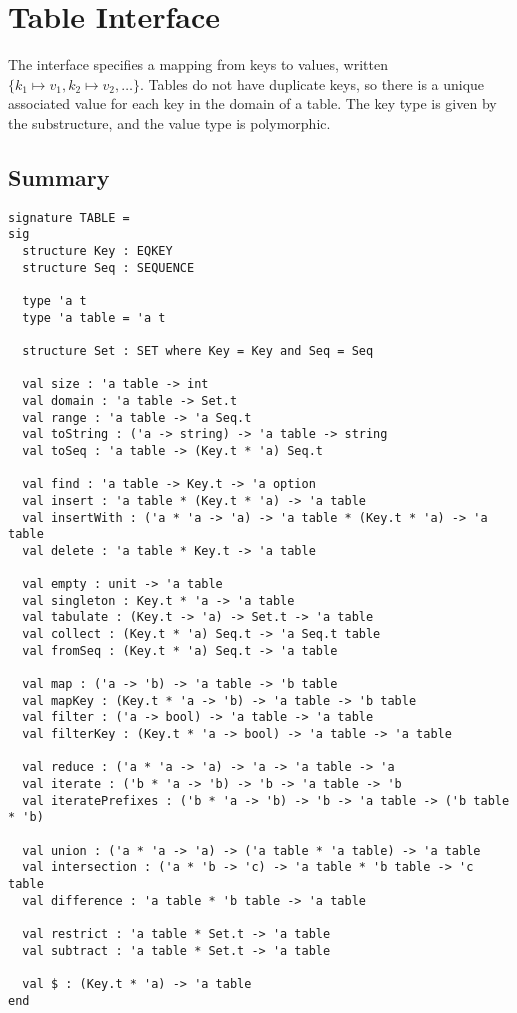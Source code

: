 \chapter{Table Interface}
\label{ch:table-interface}
\begin{preamble}
The  interface specifies a mapping from keys to values, written
$\{k_1 \mapsto v_1, k_2 \mapsto v_2, \ldots\}$. Tables do not have duplicate
keys, so there is a unique associated value for each key in the domain of
a table. The key type is given by the  substructure, and the value
type is polymorphic.
\end{preamble}

\section{Summary}
\begin{gram}
\begin{verbatim}
signature TABLE =
sig
  structure Key : EQKEY
  structure Seq : SEQUENCE

  type 'a t
  type 'a table = 'a t

  structure Set : SET where Key = Key and Seq = Seq

  val size : 'a table -> int
  val domain : 'a table -> Set.t
  val range : 'a table -> 'a Seq.t
  val toString : ('a -> string) -> 'a table -> string
  val toSeq : 'a table -> (Key.t * 'a) Seq.t

  val find : 'a table -> Key.t -> 'a option
  val insert : 'a table * (Key.t * 'a) -> 'a table
  val insertWith : ('a * 'a -> 'a) -> 'a table * (Key.t * 'a) -> 'a table
  val delete : 'a table * Key.t -> 'a table

  val empty : unit -> 'a table
  val singleton : Key.t * 'a -> 'a table
  val tabulate : (Key.t -> 'a) -> Set.t -> 'a table
  val collect : (Key.t * 'a) Seq.t -> 'a Seq.t table
  val fromSeq : (Key.t * 'a) Seq.t -> 'a table

  val map : ('a -> 'b) -> 'a table -> 'b table
  val mapKey : (Key.t * 'a -> 'b) -> 'a table -> 'b table
  val filter : ('a -> bool) -> 'a table -> 'a table
  val filterKey : (Key.t * 'a -> bool) -> 'a table -> 'a table

  val reduce : ('a * 'a -> 'a) -> 'a -> 'a table -> 'a
  val iterate : ('b * 'a -> 'b) -> 'b -> 'a table -> 'b
  val iteratePrefixes : ('b * 'a -> 'b) -> 'b -> 'a table -> ('b table * 'b)

  val union : ('a * 'a -> 'a) -> ('a table * 'a table) -> 'a table
  val intersection : ('a * 'b -> 'c) -> 'a table * 'b table -> 'c table
  val difference : 'a table * 'b table -> 'a table

  val restrict : 'a table * Set.t -> 'a table
  val subtract : 'a table * Set.t -> 'a table

  val $ : (Key.t * 'a) -> 'a table
end
\end{verbatim}
\end{gram}

